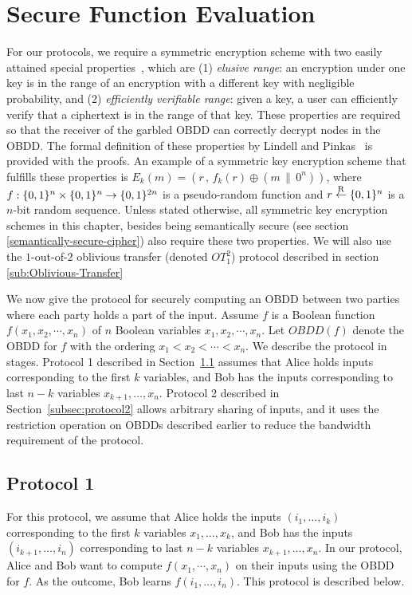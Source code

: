 \section{Secure Function Evaluation}
\label{sec:sfe-obdd}


For our protocols, we require a symmetric encryption scheme with two
easily attained special properties~\cite{LP04}, which are {\sf (1)} {\it elusive
range}: an encryption under one key is in the range of an encryption
with a different key with negligible probability, and {\sf (2)} {\it efficiently
verifiable range}: given a key, a user can efficiently verify that a
ciphertext is in the range of that key. These properties are required
so that the receiver of the garbled OBDD can correctly decrypt
nodes in the OBDD. The formal definition of these properties by
Lindell and Pinkas~\cite{LP04} is provided with the proofs. An example
of a symmetric key encryption scheme that fulfills these properties is
$E_k(m)=(r\,,\,f_k(r)\oplus (m\,\|\,0^n))$, where
$f:\{0,1\}^n\times\{0,1\}^n\rightarrow\{0,1\}^{2n}$ is a pseudo-random
function and $r\stackrel{\mathrm{R}}{\gets}\{0,1\}^n$ is a $n$-bit random sequence. Unless
stated otherwise, all symmetric key encryption schemes in this chapter,
besides being semantically secure (see section \ref{semantically-secure-cipher})
also require these two properties.  We will also use the $1$-out-of-$2$
oblivious transfer (denoted $OT^2_1$) protocol described in section \ref{sub:Oblivious-Transfer}

We now give the protocol for securely computing an OBDD between two
parties where each party holds a part of the input. Assume $f$ is a
Boolean function $f(x_1,x_2,\cdots,x_n)$ of $n$ Boolean variables
$x_1,x_2,\cdots,x_n$. Let $OBDD(f)$ denote the OBDD for $f$ with the
ordering $x_1 < x_2 < \cdots < x_n$. We describe the protocol in stages.
Protocol 1 described in Section~\ref{sec:obdd-basicprotocol} assumes that
Alice holds inputs corresponding to the first $k$ variables, and 
Bob has the inputs corresponding to last $n-k$ variables
$x_{k+1},\ldots,x_n$. Protocol 2 described in Section~\ref{subsec:protocol2}
allows arbitrary sharing of inputs, and it uses the restriction
operation on OBDDs described earlier to reduce the bandwidth requirement
of the protocol.

\subsection{Protocol 1}
\label{sec:obdd-basicprotocol}


For this protocol, we assume that Alice holds the inputs
$(i_1,\ldots,i_k)$ corresponding to the first $k$ variables
$x_1,\ldots,x_k$, and Bob has the inputs $(i_{k+1},\ldots,i_n)$
corresponding to last $n-k$ variables $x_{k+1},\ldots,x_n$. In our
protocol, Alice and Bob want to compute $f(x_1,\cdots,x_n)$ on
their inputs using the OBDD for $f$. As the outcome, Bob learns
$f(i_1,\ldots,i_n)$.  This protocol is described below.

